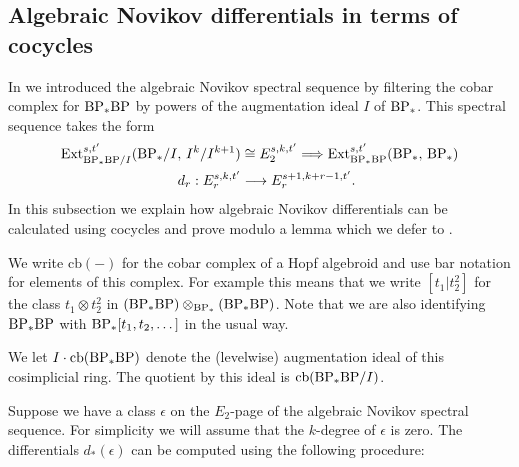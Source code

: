 
\subsection{Algebraic Novikov differentials in terms of cocycles}\label{subsec:cocycle-diffs}\hfill

In  we introduced the algebraic Novikov spectral sequence by filtering the cobar complex for $\mathrm{BP}_*\mathrm{BP}$ by powers of the augmentation ideal $I$ of $\mathrm{BP}_*$. This spectral sequence takes the form
\begin{align*}
   \operatorname{\mathrm{Ext}}_{\mathrm{BP}_*\mathrm{BP}/I}^{s,t'}(\mathrm{BP}_*/I,\, I^k/I^{k+1}) &\cong E_2^{s,k,t'} \Longrightarrow \operatorname{\mathrm{Ext}}_{\mathrm{BP}_*\mathrm{BP}}^{s,t'}(\mathrm{BP}_*,\, \mathrm{BP}_*) \\
  d_r: E_r^{s,k,t'} &\longrightarrow E_r^{s+1,k+r-1,t'}.
\end{align*}
In this subsection we explain how algebraic Novikov differentials can be calculated using cocycles and prove  modulo a lemma which we defer to .

\begin{ntn}
  We write $\mathrm{cb}(-)$ for the cobar complex of a Hopf algebroid and use bar notation for elements of this complex. For example this means that we write $[t_1 | t_2^2]$ for the class
  $t_1 \otimes t_2^2$ in $(\mathrm{BP}_*\mathrm{BP}) \otimes_{\mathrm{BP}_*} (\mathrm{BP}_*\mathrm{BP})$.
  Note that we are also identifying $\mathrm{BP}_*\mathrm{BP}$ with $\mathrm{BP}_*[t_1,t_2,\dots]$ in the usual way.

  We let $I \cdot \mathrm{cb}(\mathrm{BP}_*\mathrm{BP})$ denote the (levelwise) augmentation ideal of this cosimplicial ring. The quotient by this ideal is $\mathrm{cb}(\mathrm{BP}_*\mathrm{BP}/I)$.
\end{ntn}

Suppose we have a class $\epsilon$ on the $E_2$-page of the algebraic Novikov spectral sequence.
For simplicity we will assume that the $k$-degree of $\epsilon$ is zero.
The differentials $d_*(\epsilon)$ can be computed using the following procedure:

